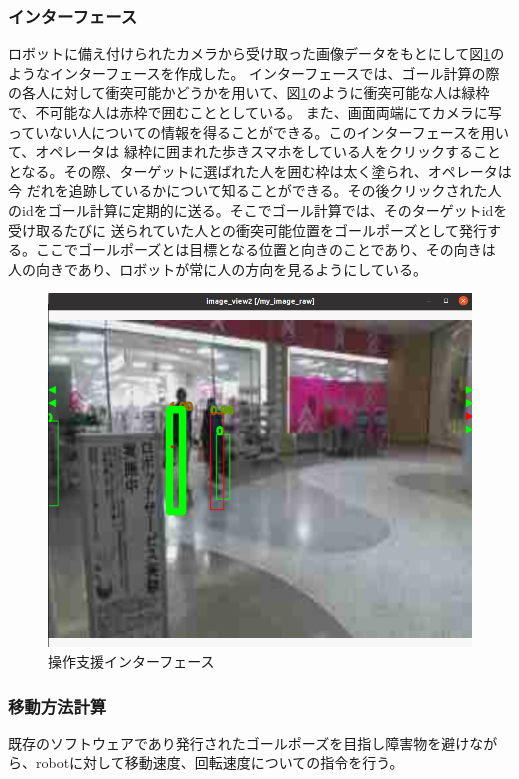 \documentclass{kuisthesis}
\begin{document}
\subsubsection{インターフェース}
ロボットに備え付けられたカメラから受け取った画像データをもとにして図\ref{pic:interface}のようなインターフェースを作成した。
インターフェースでは、ゴール計算の際の各人に対して衝突可能かどうかを用いて、図\ref{pic:interface}のように衝突可能な人は緑枠で、不可能な人は赤枠で囲むこととしている。
また、画面両端にてカメラに写っていない人についての情報を得ることができる。このインターフェースを用いて、オペレータは
緑枠に囲まれた歩きスマホをしている人をクリックすることとなる。その際、ターゲットに選ばれた人を囲む枠は太く塗られ、オペレータは今
だれを追跡しているかについて知ることができる。その後クリックされた人のidをゴール計算に定期的に送る。そこでゴール計算では、そのターゲットidを受け取るたびに
送られていた人との衝突可能位置をゴールポーズとして発行する。ここでゴールポーズとは目標となる位置と向きのことであり、その向きは
人の向きであり、ロボットが常に人の方向を見るようにしている。
\begin{figure}[H]
  
  \includegraphics[width=15cm]{img/interface.png}
  \caption{操作支援インターフェース}
  \label{pic:interface}
\end{figure}
\subsubsection{移動方法計算}
既存のソフトウェアであり発行されたゴールポーズを目指し障害物を避けながら、robotに対して移動速度、回転速度についての指令を行う。
\end{document}
